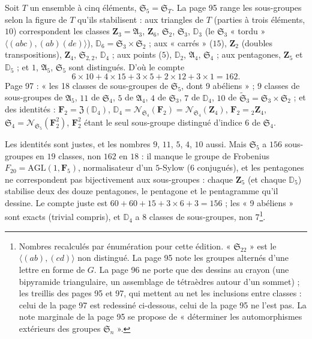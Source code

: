 \documentclass[11pt,a4paper]{article}
\begin{document}
Soit $T$ un ensemble à cinq éléments, $\mathfrak{S}_5 = \mathfrak{S}_T$. La
page 95 range les sous-groupes selon la figure de $T$ qu'ils stabilisent : aux
triangles de $T$ (parties à trois éléments, $10$) correspondent les classes
$\mathbf{Z}_3 = \mathfrak{A}_3$, $\mathbf{Z}_6$, $\mathfrak{S}_2$, $\mathfrak{S}_3$,
$\mathbb{D}_3$ (le $\mathfrak{S}_3$ « tordu » $\langle (abc), (ab)(de)\rangle$),
$\mathbb{D}_6 = \mathfrak{S}_3 \times \mathfrak{S}_2$ ; aux « carrés » ($15$),
$\mathbf{Z}_2$ (doubles transpositions), $\mathbf{Z}_4$, $\mathfrak{S}_{2,2}$,
$\mathbb{D}_4$ ; aux points ($5$), $\mathbb{D}_2$, $\mathfrak{A}_4$,
$\mathfrak{S}_4$ ; aux pentagones, $\mathbf{Z}_5$ et $\mathbb{D}_5$ ; et $1$,
$\mathfrak{A}_5$, $\mathfrak{S}_5$ sont distingués. D'où le compte
\[
  6 \times 10 + 4 \times 15 + 3 \times 5 + 2 \times 12 + 3 \times 1 = 162 .
\]
Page 97 : « les 18 classes de sous-groupes de $\mathfrak{S}_5$, dont 9
abéliens » ; $9$ classes de sous-groupes de $\mathfrak{A}_5$, $11$ de
$\mathfrak{S}_4$, $5$ de $\mathfrak{A}_4$, $4$ de $\mathfrak{S}_3$, $7$ de
$\mathbb{D}_4$, $10$ de $\widetilde{\mathfrak{S}}_3 = \mathfrak{S}_3 \times
\mathfrak{S}_2$ ; et des identités : $\mathbf{F}_2 = \mathfrak{Z}(\mathbb{D}_4)$,
$\mathbb{D}_4 = \mathcal{N}_{\mathfrak{S}_4}(\mathbf{F}_2) =
\mathcal{N}_{\mathfrak{S}_4}(\mathbf{Z}_4)$, $\mathbf{F}_2 = {}_2\mathbf{Z}_4$,
$\mathfrak{S}_4 = \mathcal{N}_{\mathfrak{S}_5}(\mathbf{F}_2^2)$, $\mathbf{F}_2^2$
étant le seul sous-groupe distingué d'indice $6$ de $\mathfrak{S}_4$.

Les identités sont justes, et les nombres $9$, $11$, $5$, $4$, $10$ aussi. Mais
$\mathfrak{S}_5$ a $156$ sous-groupes en $19$ classes, non $162$ en $18$ : il
manque le groupe de Frobenius $F_{20} = \mathrm{AGL}(1, \mathbf{F}_5)$,
normalisateur d'un $5$-Sylow ($6$ conjugués), et les pentagones ne
correspondent pas bijectivement aux sous-groupes : chaque $\mathbf{Z}_5$ (et
chaque $\mathbb{D}_5$) stabilise deux des douze pentagones, le pentagone et le
pentagramme qu'il dessine. Le compte juste est $60 + 60 + 15 + 3 \times 6 + 3
= 156$ ; les « 9 abéliens » sont exacts (trivial compris), et $\mathbb{D}_4$ a
$8$ classes de sous-groupes, non $7$\footnote{Nombres recalculés par
énumération pour cette édition. « $\mathfrak{S}_{22}$ » est le
$\langle (ab), (cd)\rangle$ non distingué. La page 95 note les groupes alternés
d'une lettre en forme de $G$. La page 96 ne porte que des dessins au crayon
(une bipyramide triangulaire, un assemblage de tétraèdres autour d'un
sommet) ; les treillis des pages 95 et 97, qui mettent au net les inclusions
entre classes : celui de la page 97 est redessiné ci-dessous, celui de la page 95 ne l'est pas. La note marginale de la page 95 se
propose de « déterminer les automorphismes extérieurs des groupes
$\mathfrak{S}_n$ ».}.
\end{document}
